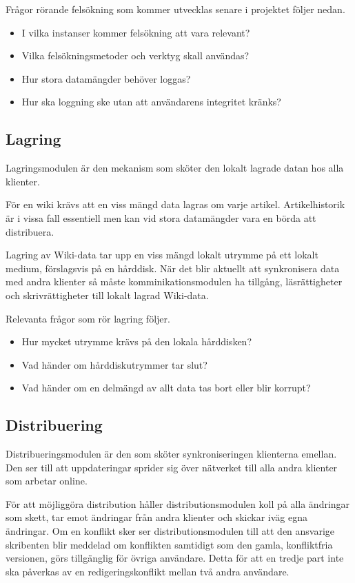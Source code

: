Frågor rörande felsökning som kommer utvecklas senare i projektet följer nedan.
\begin{itemize}
\item I vilka instanser kommer felsökning att vara relevant?
\item Vilka felsökningsmetoder och verktyg skall användas?
\item Hur stora datamängder behöver loggas?
\item Hur ska loggning ske utan att användarens integritet kränks?
\end{itemize}
\subsection{Lagring}
Lagringsmodulen är den mekanism som sköter den lokalt lagrade datan hos alla klienter.

För en wiki krävs att en viss mängd data lagras om varje artikel. Artikelhistorik är i vissa fall essentiell men kan vid stora datamängder vara en börda att distribuera.

Lagring av Wiki-data tar upp en viss mängd lokalt utrymme på ett lokalt medium, förslagsvis på en hårddisk. När det blir aktuellt att synkronisera data med andra klienter så måste komminikationsmodulen ha tillgång, läsrättigheter och skrivrättigheter till lokalt lagrad Wiki-data.

Relevanta frågor som rör lagring följer.
\begin{itemize}
\item Hur mycket utrymme krävs på den lokala hårddisken?
\item Vad händer om hårddiskutrymmer tar slut?
\item Vad händer om en delmängd av allt data tas bort eller blir korrupt?
\end{itemize}
\subsection{Distribuering}
Distribueringsmodulen är den som sköter synkroniseringen klienterna emellan. Den ser till att uppdateringar sprider sig över nätverket till alla andra klienter som arbetar online.

För att möjliggöra distribution håller distributionsmodulen koll på alla ändringar som skett, tar emot ändringar från andra klienter och skickar iväg egna ändringar. Om en konflikt sker ser distributionsmodulen till att den ansvarige skribenten blir meddelad om konflikten samtidigt som den gamla, konfliktfria versionen, görs tillgänglig för övriga användare. Detta för att en tredje part inte ska påverkas av en redigeringskonflikt mellan två andra användare.

